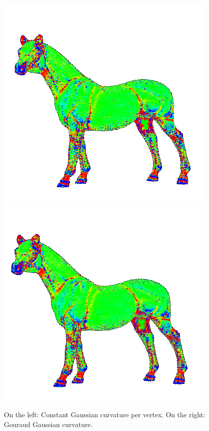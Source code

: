 \begin{figure}[!h]
    \endminipage\hfill
    \centering
    \includegraphics[scale=0.7]{images/gc-horse.png}
    \endminipage\hfill
    \centering
    \includegraphics[scale=0.7]{images/gci-horse.png}
    \endminipage
    \caption{On the left: Constant Gaussian curvature per vertex. On the right: Gouraud Gaussian curvature.}
    \label{fig:comparison-gc-gci}
\end{figure}

